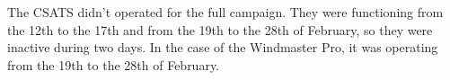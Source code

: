 The CSATS didn't operated for the full campaign. They were functioning from the 12th to the 17th and from the 19th to the 28th of February, so they were inactive during two days. In the case of the Windmaster Pro, it was operating from the 19th to the 28th of February. 